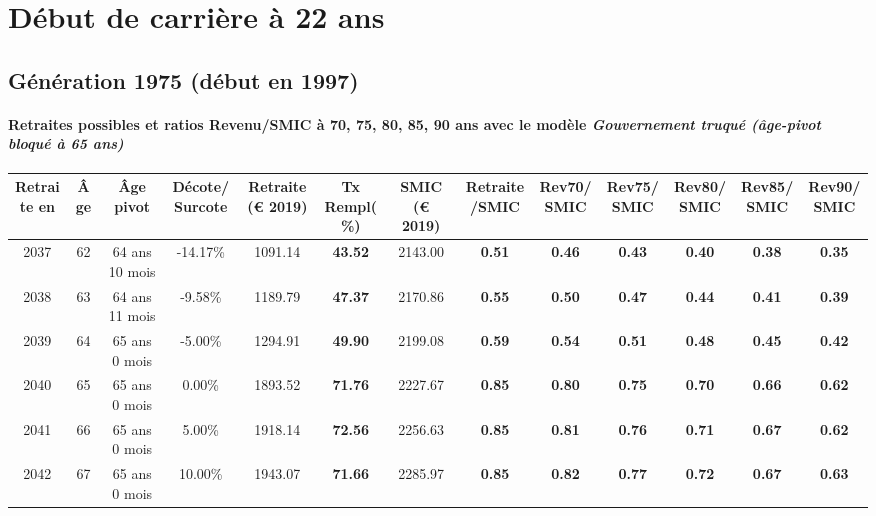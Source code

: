  \addto{\captionsenglish}{ \renewcommand{\mtctitle}{}} \setcounter{minitocdepth}{2} 
 \minitoc \newpage 

\section{Début de carrière à 22 ans} 

\subsection{Génération 1975 (début en 1997)} 

\paragraph{Retraites possibles et ratios Revenu/SMIC à 70, 75, 80, 85, 90 ans avec le modèle \emph{Gouvernement truqué (âge-pivot bloqué à 65 ans)}}  
 
{ \scriptsize \begin{center} 
\begin{tabular}[htb]{|c|c||c|c||c|c||c||c|c|c|c|c|c|} 
\hline 
 Retraite en &  Âge &  Âge pivot &  Décote/Surcote &  Retraite (\euro{} 2019) &  Tx Rempl(\%) &  SMIC (\euro{} 2019) &  Retraite/SMIC &  Rev70/SMIC &  Rev75/SMIC &  Rev80/SMIC &  Rev85/SMIC &  Rev90/SMIC \\ 
\hline \hline 
 2037 &  62 &  64 ans 10 mois &  -14.17\% &  1091.14 &  {\bf 43.52} &  2143.00 &  {\bf {\color{red} 0.51}} &  {\bf {\color{red} 0.46}} &  {\bf {\color{red} 0.43}} &  {\bf {\color{red} 0.40}} &  {\bf {\color{red} 0.38}} &  {\bf {\color{red} 0.35}} \\ 
\hline 
 2038 &  63 &  64 ans 11 mois &  -9.58\% &  1189.79 &  {\bf 47.37} &  2170.86 &  {\bf {\color{red} 0.55}} &  {\bf {\color{red} 0.50}} &  {\bf {\color{red} 0.47}} &  {\bf {\color{red} 0.44}} &  {\bf {\color{red} 0.41}} &  {\bf {\color{red} 0.39}} \\ 
\hline 
 2039 &  64 &  65 ans 0 mois &  -5.00\% &  1294.91 &  {\bf 49.90} &  2199.08 &  {\bf {\color{red} 0.59}} &  {\bf {\color{red} 0.54}} &  {\bf {\color{red} 0.51}} &  {\bf {\color{red} 0.48}} &  {\bf {\color{red} 0.45}} &  {\bf {\color{red} 0.42}} \\ 
\hline 
 2040 &  65 &  65 ans 0 mois &  0.00\% &  1893.52 &  {\bf 71.76} &  2227.67 &  {\bf {\color{red} 0.85}} &  {\bf {\color{red} 0.80}} &  {\bf {\color{red} 0.75}} &  {\bf {\color{red} 0.70}} &  {\bf {\color{red} 0.66}} &  {\bf {\color{red} 0.62}} \\ 
\hline 
 2041 &  66 &  65 ans 0 mois &  5.00\% &  1918.14 &  {\bf 72.56} &  2256.63 &  {\bf {\color{red} 0.85}} &  {\bf {\color{red} 0.81}} &  {\bf {\color{red} 0.76}} &  {\bf {\color{red} 0.71}} &  {\bf {\color{red} 0.67}} &  {\bf {\color{red} 0.62}} \\ 
\hline 
 2042 &  67 &  65 ans 0 mois &  10.00\% &  1943.07 &  {\bf 71.66} &  2285.97 &  {\bf {\color{red} 0.85}} &  {\bf {\color{red} 0.82}} &  {\bf {\color{red} 0.77}} &  {\bf {\color{red} 0.72}} &  {\bf {\color{red} 0.67}} &  {\bf {\color{red} 0.63}} \\ 
\hline 
\hline 
\end{tabular} 
\end{center} } 
